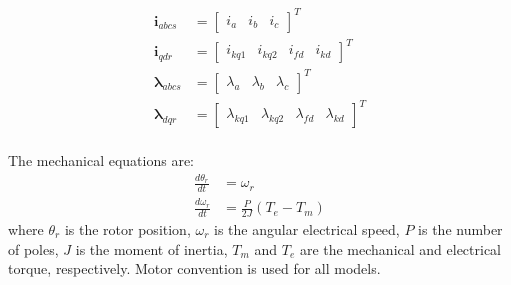\begin{align}
   \mathbf{i}_{abcs} &= 
  \begin{bmatrix}
    i_{a} & i_{b} & i_{c}
  \end{bmatrix}^T \\
  \mathbf{i}_{qdr} &= 
  \begin{bmatrix}
    i_{kq1} & i_{kq2} & i_{fd} & i_{kd}
  \end{bmatrix}^T \\
  \boldsymbol{\lambda}_{abcs} &= 
  \begin{bmatrix}
    \lambda_{a} & \lambda_{b} & \lambda_{c}
  \end{bmatrix}^T \\
  \boldsymbol{\lambda}_{dqr} &= 
  \begin{bmatrix}
     \lambda_{kq1} & \lambda_{kq2} & \lambda_{fd} & \lambda_{kd} 
  \end{bmatrix}^T \\
 \end{align}


The mechanical equations are:
%
\begin{align}
\frac{d\theta_r}{dt} &= \omega_r \label{eq:d_theta} \\
\frac{d\omega_r}{dt} &= \frac{P}{2J} (T_e-T_m) \label{eq:d_omega}
\end{align}
%
where $\theta_r$ is the rotor position, $\omega_r$ is the angular electrical speed, $P$ is the number of poles, $J$ is the moment of inertia, $T_m$ and $T_e$ are the mechanical and electrical torque, respectively. Motor convention is used for all models. 

\iffalse
